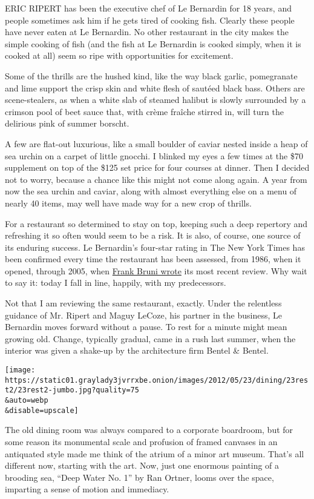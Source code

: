 ERIC RIPERT has been the executive chef of Le Bernardin for 18 years,
and people sometimes ask him if he gets tired of cooking fish. Clearly
these people have never eaten at Le Bernardin. No other restaurant in
the city makes the simple cooking of fish (and the fish at Le Bernardin
is cooked simply, when it is cooked at all) seem so ripe with
opportunities for excitement.

Some of the thrills are the hushed kind, like the way black garlic,
pomegranate and lime support the crisp skin and white flesh of sautéed
black bass. Others are scene-stealers, as when a white slab of steamed
halibut is slowly surrounded by a crimson pool of beet sauce that, with
crème fraîche stirred in, will turn the delirious pink of summer
borscht.

A few are flat-out luxurious, like a small boulder of caviar nested
inside a heap of sea urchin on a carpet of little gnocchi. I blinked my
eyes a few times at the \$70 supplement on top of the \$125 set price
for four courses at dinner. Then I decided not to worry, because a
chance like this might not come along again. A year from now the sea
urchin and caviar, along with almost everything else on a menu of nearly
40 items, may well have made way for a new crop of thrills.

For a restaurant so determined to stay on top, keeping such a deep
repertory and refreshing it so often would seem to be a risk. It is
also, of course, one source of its enduring success. Le Bernardin's
four-star rating in The New York Times has been confirmed every time the
restaurant has been assessed, from 1986, when it opened, through 2005,
when
\href{http://www.nytimes3xbfgragh.onion/2005/03/16/dining/reviews/16rest.html?pagewanted=all}{Frank
Bruni wrote} its most recent review. Why wait to say it: today I fall in
line, happily, with my predecessors.

Not that I am reviewing the same restaurant, exactly. Under the
relentless guidance of Mr. Ripert and Maguy LeCoze, his partner in the
business, Le Bernardin moves forward without a pause. To rest for a
minute might mean growing old. Change, typically gradual, came in a rush
last summer, when the interior was given a shake-up by the architecture
firm Bentel \& Bentel.

\texttt{[image: https://static01.graylady3jvrrxbe.onion/images/2012/05/23/dining/23rest2/23rest2-jumbo.jpg?quality=75\\\&auto=webp\\\&disable=upscale]}

The old dining room was always compared to a corporate boardroom, but
for some reason its monumental scale and profusion of framed canvases in
an antiquated style made me think of the atrium of a minor art museum.
That's all different now, starting with the art. Now, just one enormous
painting of a brooding sea, ``Deep Water No. 1'' by Ran Ortner, looms
over the space, imparting a sense of motion and immediacy.

